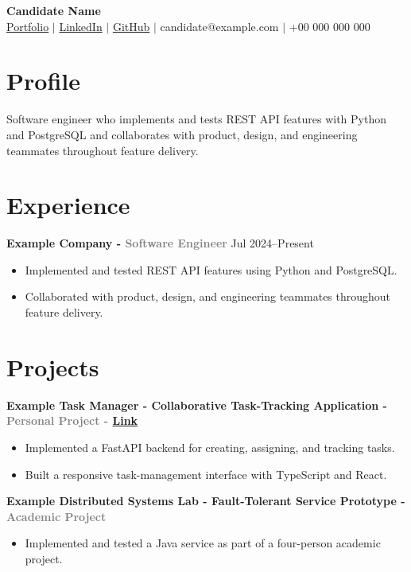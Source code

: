 \documentclass[a4paper,10pt]{article}
\begin{document}
\singlespacing

\begin{center}
  {\Huge \textbf{Candidate Name}} \\[0.10cm]
  \href{https://example.com/portfolio}{Portfolio} $\vert$
  \href{https://example.com/linkedin}{LinkedIn} $\vert$
  \href{https://example.com/github}{GitHub} $\vert$
  candidate@example.com $\vert$ +00 000 000 000
\end{center}

\begin{small}
\section*{Profile}

Software engineer who implements and tests REST API features with Python and
PostgreSQL and collaborates with product, design, and engineering teammates
throughout feature delivery.

\section*{Experience}

\textbf{Example Company - \textcolor{gray}{Software Engineer}} \hfill Jul 2024--Present
\begin{itemize}[leftmargin=*]
\item Implemented and tested REST API features using Python and PostgreSQL.
\item Collaborated with product, design, and engineering teammates throughout feature delivery.
\end{itemize}

\section*{Projects}

\textbf{Example Task Manager - Collaborative Task-Tracking Application -
\textcolor{gray}{Personal Project - \href{https://example.com/task-manager}{Link}}}
\begin{itemize}[leftmargin=*]
\item Implemented a FastAPI backend for creating, assigning, and tracking tasks.
\item Built a responsive task-management interface with TypeScript and React.
\end{itemize}

\textbf{Example Distributed Systems Lab - Fault-Tolerant Service Prototype -
\textcolor{gray}{Academic Project}}
\begin{itemize}[leftmargin=*]
\item Implemented and tested a Java service as part of a four-person academic project.
\end{itemize}


\end{small}
\end{document}
